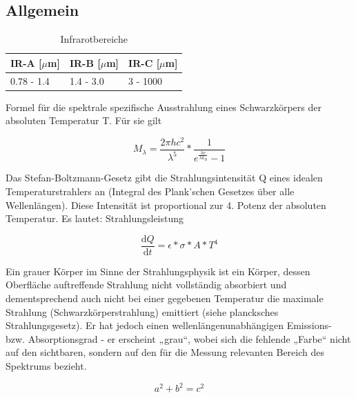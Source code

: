 \subsection{Allgemein}



\begin{table}[]
	\centering
	\label{my-label}
	\begin{tabular}{|l|l|l|}
		\hline
		\rowcolor{gray} IR-A {[}$\mu$m{]} & IR-B {[}$\mu$m{]} & IR-C {[}$\mu$m{]} \\ \hline
		0.78 - 1.4  & 1.4 - 3.0   & 3 - 1000    \\ \hline
	\end{tabular}
	\caption{Infrarotbereiche}
\end{table}


Formel für die spektrale spezifische Ausstrahlung  eines Schwarzkörpers der absoluten Temperatur  T. Für sie gilt

\begin{equation}
\label{eq5}
M_{\lambda } = \frac{2\pi h c^2 }{\lambda^5}*\frac{1}{e^\frac{hc}{\lambda k_{B}}-1}
\end{equation}

Das Stefan-Boltzmann-Gesetz gibt die Strahlungsintensität Q eines idealen Temperaturstrahlers an (Integral des Plank'schen Gesetzes über alle Wellenlängen). Diese Intensität ist proportional zur 4. Potenz der absoluten Temperatur. Es lautet:
Strahlungsleistung

\begin{equation}
\label{eq1}
\frac{\mathrm{d} Q}{\mathrm{d} t} = \epsilon *\sigma * A * T^4
\end{equation}






Ein grauer Körper im Sinne der Strahlungsphysik ist ein Körper, dessen Oberfläche auftreffende Strahlung nicht vollständig absorbiert und dementsprechend auch nicht bei einer gegebenen Temperatur die maximale Strahlung (Schwarzkörperstrahlung) emittiert (siehe plancksches Strahlungsgesetz). Er hat jedoch einen wellenlängenunabhängigen Emissions- bzw. Absorptionsgrad - er erscheint „grau“, wobei sich die fehlende „Farbe“ nicht auf den sichtbaren, sondern auf den für die Messung relevanten Bereich des Spektrums bezieht.

\begin{equation}
\label{eq2}
a^2+b^2=c^2
\end{equation}


